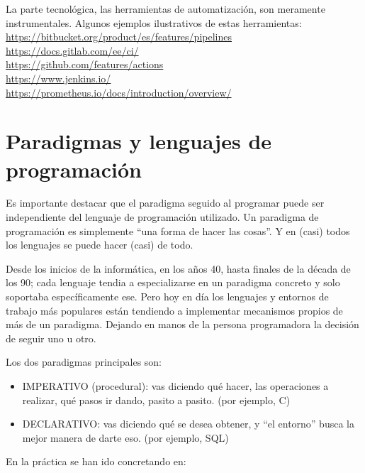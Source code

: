 \documentclass[spanish,12pt,a4paper,final,oneside]{book}
\begin{document}
La parte tecnológica, las herramientas de automatización, son meramente instrumentales. Algunos ejemplos ilustrativos de estas herramientas:
\\ \url{https://bitbucket.org/product/es/features/pipelines}
\\ \url{https://docs.gitlab.com/ee/ci/}
\\ \url{https://github.com/features/actions}
\\ \url{https://www.jenkins.io/}
\\ \url{https://prometheus.io/docs/introduction/overview/}






\section{Paradigmas y lenguajes de programación}
Es importante destacar que el paradigma seguido al programar puede ser independiente del lenguaje de programación utilizado. Un paradigma de programación es simplemente ``una forma de hacer las cosas''. Y en (casi) todos los lenguajes se puede hacer (casi) de todo.

Desde los inicios de la informática, en los años 40, hasta finales de la década de los 90; cada lenguaje tendia a especializarse en un paradigma concreto y solo soportaba específicamente ese. Pero hoy en día los lenguajes y entornos de trabajo más populares están tendiendo a implementar mecanismos propios de más de un paradigma. Dejando en manos de la persona programadora la decisión de seguir uno u otro.

Los dos paradigmas principales son:

\begin{itemize}

\item IMPERATIVO (procedural): vas diciendo qué hacer, las operaciones a realizar, qué pasos ir dando, pasito a pasito. (por ejemplo, C)

\item DECLARATIVO: vas diciendo qué se desea obtener, y ``el entorno'' busca la mejor manera de darte eso. (por ejemplo, SQL)

\end{itemize}

En la práctica se han ido concretando en:
\end{document}

